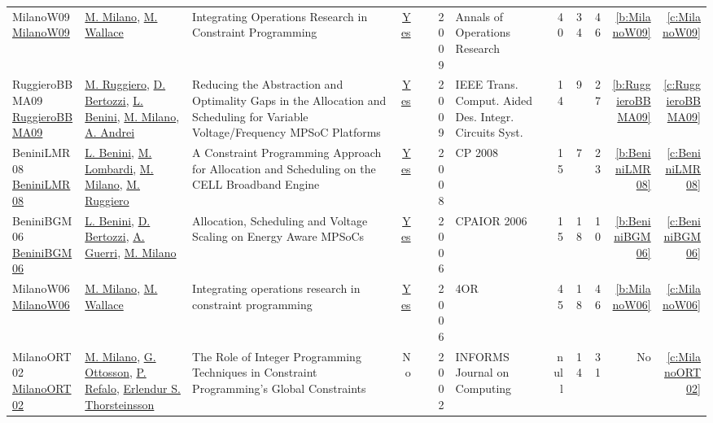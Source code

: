 {\begin{longtable}{>{\raggedright\arraybackslash}p{3cm}>{\raggedright\arraybackslash}p{6cm}>{\raggedright\arraybackslash}p{6.5cm}rrrp{2.5cm}rrrrr}
MilanoW09 \href{http://dx.doi.org/10.1007/s10479-009-0654-9}{MilanoW09} & \hyperref[auth:a144]{M. Milano}, \hyperref[auth:a117]{M. Wallace} & Integrating Operations Research in Constraint Programming & \href{../works/MilanoW09.pdf}{Yes} & \cite{MilanoW09} & 2009 & Annals of Operations Research & 40 & 34 & 46 & \ref{b:MilanoW09} & \ref{c:MilanoW09}\\
RuggieroBBMA09 \href{https://doi.org/10.1109/TCAD.2009.2013536}{RuggieroBBMA09} & \hyperref[auth:a727]{M. Ruggiero}, \hyperref[auth:a381]{D. Bertozzi}, \hyperref[auth:a248]{L. Benini}, \hyperref[auth:a144]{M. Milano}, \hyperref[auth:a728]{A. Andrei} & Reducing the Abstraction and Optimality Gaps in the Allocation and Scheduling for Variable Voltage/Frequency MPSoC Platforms & \href{../works/RuggieroBBMA09.pdf}{Yes} & \cite{RuggieroBBMA09} & 2009 & {IEEE} Trans. Comput. Aided Des. Integr. Circuits Syst. & 14 & 9 & 27 & \ref{b:RuggieroBBMA09} & \ref{c:RuggieroBBMA09}\\
BeniniLMR08 \href{http://dx.doi.org/10.1007/978-3-540-85958-1_2}{BeniniLMR08} & \hyperref[auth:a248]{L. Benini}, \hyperref[auth:a143]{M. Lombardi}, \hyperref[auth:a144]{M. Milano}, \hyperref[auth:a727]{M. Ruggiero} & A Constraint Programming Approach for Allocation and Scheduling on the CELL Broadband Engine & \href{../works/BeniniLMR08.pdf}{Yes} & \cite{BeniniLMR08} & 2008 & CP 2008 & 15 & 7 & 23 & \ref{b:BeniniLMR08} & \ref{c:BeniniLMR08}\\
BeniniBGM06 \href{https://doi.org/10.1007/11757375\_6}{BeniniBGM06} & \hyperref[auth:a248]{L. Benini}, \hyperref[auth:a381]{D. Bertozzi}, \hyperref[auth:a382]{A. Guerri}, \hyperref[auth:a144]{M. Milano} & Allocation, Scheduling and Voltage Scaling on Energy Aware MPSoCs & \href{../works/BeniniBGM06.pdf}{Yes} & \cite{BeniniBGM06} & 2006 & CPAIOR 2006 & 15 & 18 & 10 & \ref{b:BeniniBGM06} & \ref{c:BeniniBGM06}\\
MilanoW06 \href{http://dx.doi.org/10.1007/s10288-006-0019-z}{MilanoW06} & \hyperref[auth:a144]{M. Milano}, \hyperref[auth:a117]{M. Wallace} & Integrating operations research in constraint programming & \href{../works/MilanoW06.pdf}{Yes} & \cite{MilanoW06} & 2006 & 4OR & 45 & 18 & 46 & \ref{b:MilanoW06} & \ref{c:MilanoW06}\\
MilanoORT02 \href{http://dx.doi.org/10.1287/ijoc.14.4.387.2830}{MilanoORT02} & \hyperref[auth:a144]{M. Milano}, \hyperref[auth:a950]{G. Ottosson}, \hyperref[auth:a257]{P. Refalo}, \hyperref[auth:a887]{Erlendur S. Thorsteinsson} & The Role of Integer Programming Techniques in Constraint Programming's Global Constraints & No & \cite{MilanoORT02} & 2002 & INFORMS Journal on Computing & null & 14 & 31 & No & \ref{c:MilanoORT02}\\

\end{longtable}}
